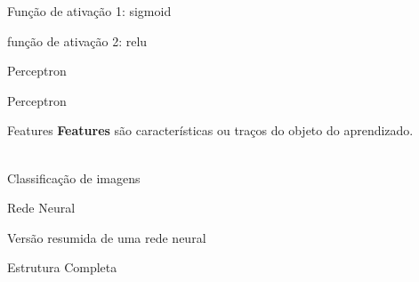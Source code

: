 \documentclass[10pt]{beamer}
\begin{document}
\begin{frame}{Função de ativação 1: sigmoid}

\end{frame}

\begin{frame}{função de ativação 2: relu}

\end{frame}

\begin{frame}[fragile]{Perceptron}

\end{frame}

\begin{frame}[fragile]{Perceptron}

\end{frame}

\begin{frame}[fragile]{Features}
\textbf{\alert{Features}} são características ou traços do objeto do aprendizado.
\\
\\
\end{frame}

\begin{frame}[fragile]{Classificação de imagens}


\end{frame}

\begin{frame}[fragile]{Rede Neural}

\end{frame}

\begin{frame}[fragile]{Versão resumida de uma rede neural}

\end{frame}

\begin{frame}{Estrutura Completa}

\end{frame}
\end{document}
